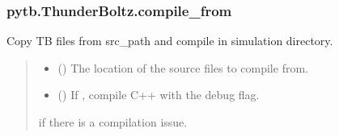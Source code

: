 \documentclass[letterpaper,10pt,english,openany,oneside]{sphinxmanual}
\begin{document}
\begin{fulllineitems}
\begin{fulllineitems}
\end{fulllineitems}


\sphinxstepscope


\subsubsection{pytb.ThunderBoltz.compile\_from}
\label{\detokenize{api/pytb.ThunderBoltz.compile_from:pytb-thunderboltz-compile-from}}\label{\detokenize{api/pytb.ThunderBoltz.compile_from::doc}}

\begin{fulllineitems}
\label{\detokenize{api/pytb.ThunderBoltz.compile_from:pytb.ThunderBoltz.compile_from}}
\pysigstartsignatures
{}
\pysigstopsignatures
\sphinxAtStartPar
Copy TB files from src\_path and compile
in simulation directory.
\begin{quote}\begin{description}
\begin{itemize}
\item {} 
\sphinxAtStartPar
{} () \textendash{} The location of the source files
to compile from.

\item {} 
\sphinxAtStartPar
{} () \textendash{} If , compile C++ with the 
debug flag.

\end{itemize}

\sphinxAtStartPar
{} \textendash{} if there is a compilation issue.

\end{description}\end{quote}


\end{fulllineitems}
\end{fulllineitems}
\end{document}
